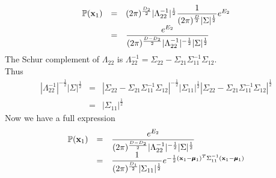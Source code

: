 \documentclass[11pt,a4paper]{article}
\begin{document}
\[\begin{array}{rcl}
\mathbb{P}(\textbf{x}_1)&=&(2\pi)^{\frac{D_2}{2}}|\Lambda_{22}^{-1}|^{\frac{1}{2}}\dfrac{1}{(2\pi)^{\frac{D}{2}}|\Sigma|^{\frac{1}{2}}}e^{E_2}\\
&=&\dfrac{e^{E_2}}{(2\pi)^{\frac{D-D_2}{2}}|\Lambda_{22}^{-1}|^{-\frac{1}{2}}|\Sigma|^{\frac{1}{2}}}
\end{array}\]
The Schur complement of $\Lambda_{22}$ is $\Lambda^{-1}_{22}=\Sigma_{22}-\Sigma_{21}\Sigma_{11}^{-1}\Sigma_{12}$.\\
Thus \[\begin{array}{rcl}
|\Lambda_{22}^{-1}|^{-\frac{1}{2}}|\Sigma|^{\frac{1}{2}}&=&|\Sigma_{22}-\Sigma_{21}\Sigma_{11}^{-1}\Sigma_{12}|^{-\frac{1}{2}}|\Sigma_{11}|^{\frac{1}{2}}|\Sigma_{22}-\Sigma_{21}\Sigma_{11}^{-1}\Sigma_{12}|^{\frac{1}{2}}\\
&=&|\Sigma_{11}|^{\frac{1}{2}}
\end{array}\]
Now we have a full expression
\[\begin{array}{rcl}
\mathbb{P}(\textbf{x}_1)&=&\dfrac{e^{E_2}}{(2\pi)^{\frac{D-D_2}{2}}|\Lambda_{22}^{-1}|^{-\frac{1}{2}}|\Sigma|^{\frac{1}{2}}}\\
&=&\dfrac{1}{(2\pi)^{\frac{D_1}{2}}|\Sigma_{11}|^{\frac{1}{2}}}e^{-\frac{1}{2}(\textbf{x}_1-\pmb{\mu}_1)^T\Sigma_{11}^{-1}(\textbf{x}_1-\pmb{\mu}_1)}
\end{array}\]
\proved
\end{document}
